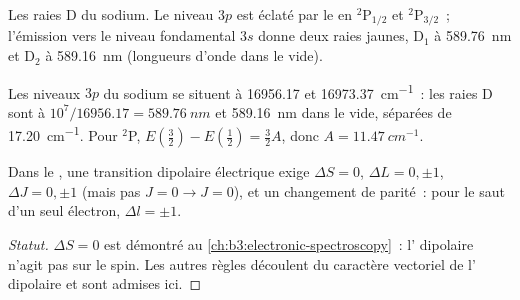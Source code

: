\begin{omfigure}

{\small Les raies D du sodium. Le niveau $3p$ est éclaté par le  en ${}^2$P$_{1/2}$ et ${}^2$P$_{3/2}$~; l'émission vers le
niveau fondamental $3s$ donne deux raies jaunes, D$_1$ à
\qty{589.76}{nm} et D$_2$ à \qty{589.16}{nm} (longueurs d'onde dans le
vide).}
\end{omfigure}

\begin{example}\label{ex:b3:many-electron-atoms:sodium}
Les niveaux $3p$ du sodium se situent à 16956.17 et
\qty{16973.37}{cm^{-1}}~: les raies D sont à
$10^7/16956.17 = \qty{589.76}{nm}$ et \qty{589.16}{nm} dans le vide,
séparées de \qty{17.20}{cm^{-1}}. Pour ${}^2$P, $E(\frac32) - E(\frac12) =
\frac32A$, donc $A = \qty{11.47}{cm^{-1}}$.
\end{example}

\begin{proposition}\label{prop:b3:many-electron-atoms:selection-atoms}
Dans le , une transition dipolaire
électrique exige
$\Delta S = 0$, $\Delta L = 0, \pm1$, $\Delta J = 0, \pm1$ (mais pas $J = 0 \to J
= 0$), et un changement de parité~: pour le saut d'un seul électron,
$\Delta l = \pm1$.
\end{proposition}
\begin{proof}[Statut]
$\Delta S = 0$ est démontré au \cref{ch:b3:electronic-spectroscopy}~:
l' dipolaire n'agit pas sur le spin. Les autres règles découlent
du caractère vectoriel de l' dipolaire et sont admises ici.
\end{proof}


